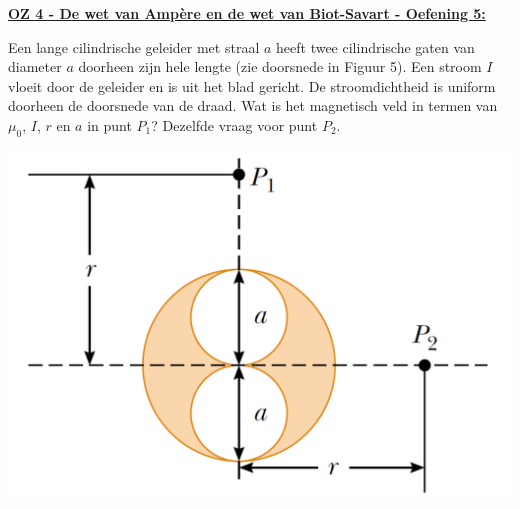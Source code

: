 \textbf{\underline{OZ 4 - De wet van Ampère en de wet van Biot-Savart - Oefening 5:}}
\vspace{0.5cm}



Een lange cilindrische geleider met straal $a$ heeft twee cilindrische gaten van diameter $a$ doorheen zijn hele lengte (zie doorsnede in Figuur 5). Een stroom $I$ vloeit door de geleider en is uit het blad gericht. De stroomdichtheid is uniform doorheen de doorsnede van de draad. Wat is het magnetisch veld in termen van $\mu_0$, $I$, $r$ en $a$ in punt $P_1$? Dezelfde vraag voor punt $P_2$.
    
\begin{center}
    \includegraphics[scale = 0.3]{oz04/resources/Oz4Oef5.png}
\end{center}


